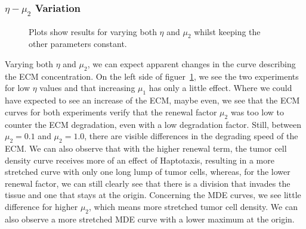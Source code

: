 \subsubsection*{$\eta -\mu_2$ Variation}
\begin{figure}[h!]
    \centering
    \caption{Plots show results for varying both $\eta$ and $\mu_2$ whilst keeping the other parameters constant.}
    \label{fig:prolif_eta_mu_2_variation}
\end{figure}

Varying both $\eta$ and $\mu_2$, we can expect apparent changes in the curve describing the ECM concentration. On the left side of figuer~\ref{fig:prolif_eta_mu_2_variation}, we see the two experiments for low $\eta$ values and that increasing $\mu_1$ has only a little effect. Where we could have expected to see an increase of the ECM, maybe even, we see that the ECM curves for both experiments verify that the renewal factor $\mu_2$ was too low to counter the ECM degradation, even with a low degradation factor. Still, between $\mu_2=0.1$ and $\mu_2=1.0$, there are visible differences in the degrading speed of the ECM. We can also observe that with the higher renewal term, the tumor cell density curve receives more of an effect of Haptotaxis, resulting in a more stretched curve with only one long lump of tumor cells, whereas, for the lower renewal factor, we can still clearly see that there is a division that invades the tissue and one that stays at the origin. Concerning the MDE curves, we see little difference for higher $\mu_2$, which means more stretched tumor cell density. We can also observe a more stretched MDE curve with a lower maximum at the origin. 

